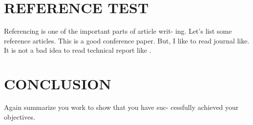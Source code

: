 \documentclass[conference]{sig-alternate}
\begin{document}
\section{REFERENCE TEST}
Referencing is one of the important parts of article writ-
ing. Let's list some reference articles. This is\cite{Blum2005} a good
conference paper. But, I like to read journal like\cite{Samarati:2001:PRI:627337.628183}. It is
not a bad idea to read technical report like \cite{Li2011}.
\section{CONCLUSION}
Again summarize you work to show that you have suc-
cessfully achieved your objectives.



\end{document}
